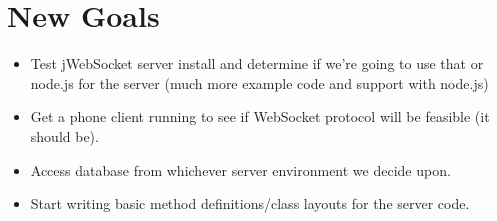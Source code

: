 \documentclass[11pt]{article} %
\begin{document}
\section{New Goals}

\begin{itemize}
	\item Test jWebSocket server install and determine if we're going to use that or node.js for the server (much more example code and support with node.js)
       \item Get a phone client running to see if WebSocket protocol will be feasible (it should be).
       \item Access database from whichever server environment we decide upon.
       \item Start writing basic method definitions/class layouts for the server code.
\end{itemize}
\end{document}
